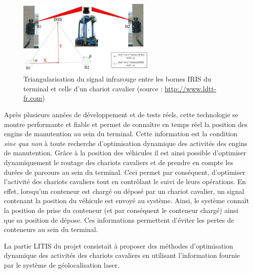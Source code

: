 \begin{figure}[ht]
\centering
 \includegraphics[width=0.6\textwidth]{./chapitres/simulation/triangularisationLaser.jpg}
  \caption{Triangularisation du signal infrarouge entre les bornes IRIS du terminal et celle d'un chariot cavalier (source : \href{http://www.ldtt-fr.com}{http://www.ldtt-fr.com})}
  \label{fig:triangularisation}
\end{figure}

Après plusieurs années de développement et de tests réels, cette technologie se montre performante et fiable et permet de connaître en temps réel la position des engins de manutention au sein du terminal. Cette information est la condition \textit{sine qua non} à toute recherche d'optimisation dynamique des activités des engins de manutention. Grâce à la position des véhicules il est ainsi possible d'optimiser dynamiquement le routage des chariots cavaliers et de prendre en compte les durées de parcours au sein du terminal. Ceci permet par conséquent, d'optimiser l'activité des chariots cavaliers tout en contrôlant le suivi de leurs opérations. En effet, lorsqu'un conteneur est chargé ou déposé par un chariot cavalier, un signal contenant la position du véhicule est envoyé au système. Ainsi, le système connaît la position de prise du conteneur (et par conséquent le conteneur chargé) ainsi que sa position de dépose. Ces informations permettent d'éviter les pertes de conteneurs au sein du terminal.

La partie LITIS du projet consistait à proposer des méthodes d'optimisation dynamique des activités des chariots cavaliers en utilisant l'information fournie par le système de géolocalisation laser. 
